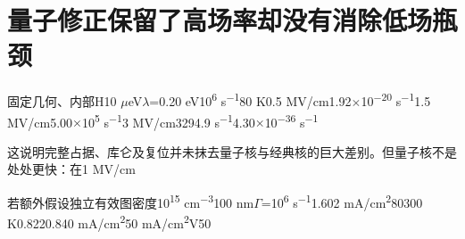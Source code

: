 \documentclass[11pt,a4paper]{article}
\begin{document}
\section{{\cjkfont 量子修正保留了高场率却没有消除低场瓶颈}\allowbreak{}}\label{sec:44}
{\cjkfont 固定几何、内部}\allowbreak{}H\allowbreak{}10 \ensuremath{\mu}eV\allowbreak{}\ensuremath{\lambda}=\allowbreak{}0.20 eV\allowbreak{}10\textsuperscript{6} s\textsuperscript{−1}\allowbreak{}80 K\allowbreak{}0.5 MV/cm\allowbreak{}1.92\ensuremath{\times}10\textsuperscript{−20} s\textsuperscript{−1}\allowbreak{}1.5 MV/cm\allowbreak{}5.00\ensuremath{\times}10\textsuperscript{5} s\textsuperscript{−1}\allowbreak{}3 MV/cm\allowbreak{}3294.9 s\textsuperscript{−1}\allowbreak{}4.30\ensuremath{\times}10\textsuperscript{−36} s\textsuperscript{−1}\allowbreak{}
\par
{\cjkfont 这说明完整占据、库仑及复位并未抹去量子核与经典核的巨大差别。但量子核不是处处更快：在}\allowbreak{}1 MV/cm\allowbreak{}
\par
{\cjkfont 若额外假设独立有效图密度}\allowbreak{}10\textsuperscript{15} cm\textsuperscript{−3}\allowbreak{}100 nm\allowbreak{}\ensuremath{\Gamma}=\allowbreak{}10\textsuperscript{6} s\textsuperscript{−1}\allowbreak{}1.602 mA/cm\textsuperscript{2}\allowbreak{}80\allowbreak{}300 K\allowbreak{}0.822\allowbreak{}0.840 mA/cm\textsuperscript{2}\allowbreak{}50 mA/cm\textsuperscript{2}\allowbreak{}V50\allowbreak{}
\par
\end{document}
